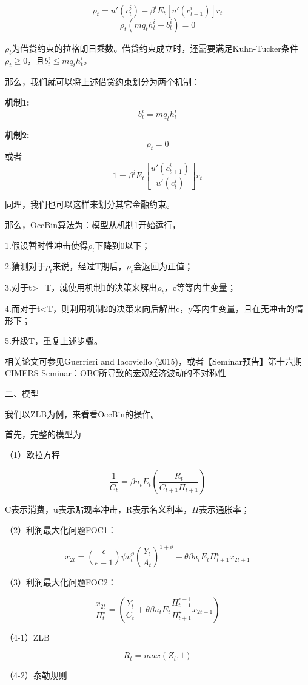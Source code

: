 \documentclass[cn,10pt,math=newtx,citestyle=gb7714-2015,bibstyle=gb7714-2015]{elegantbook}
\begin{document}
$$\rho_t=u'(c_t^i)-\beta^iE_t\left[u'(c_{t+1}^i)\right]r_t$$
$$\rho_t\left(mq_th_t^i-b_t^i\right)=0$$

$\rho_t$为借贷约束的拉格朗日乘数。借贷约束成立时，还需要满足Kuhn-Tucker条件$\rho_t\ge0$，且$b_t^i\le mq_th_t^i$。

那么，我们就可以将上述借贷约束划分为两个机制：

\textbf{机制1:}
$$b_t^i=mq_th_t^i$$

\textbf{机制2:}
$$\rho_t=0$$
或者
$$ 1=\beta^iE_t\left[\frac{u'(c_{t+1}^i)}{u'(c_{t}^i)}\right]r_t$$

同理，我们也可以这样来划分其它金融约束。



那么，OccBin算法为：模型从机制1开始运行，

1.假设暂时性冲击使得$\rho_t$下降到0以下；

2.猜测对于$\rho_t$来说，经过T期后，$\rho_t$会返回为正值；

3.对于t>=T，就使用机制1的决策来解出$\rho_t$，c等等内生变量；

4.而对于t<T，则利用机制2的决策来向后解出c，y等内生变量，且在无冲击的情形下；

5.升级T，重复上述步骤。



相关论文可参见Guerrieri and Iacoviello (2015)，或者【Seminar预告】第十六期CIMERS Seminar：OBC所导致的宏观经济波动的不对称性

二、模型

我们以ZLB为例，来看看OccBin的操作。

首先，完整的模型为

（1）欧拉方程

$$\frac{1}{C_t}=\beta u_tE_t\left(\frac{R_t}{C_{t+1}\Pi_{t+1}}\right)$$

C表示消费，u表示贴现率冲击，R表示名义利率，$\Pi$表示通胀率；

（2）利润最大化问题FOC1：

$$x_{2t}=\left(\frac{\epsilon}{\epsilon-1}\right)\psi v_t^{\vartheta}\left(\frac{Y_t}{A_t}\right)^{1+\vartheta}+\theta\beta u_tE_t\Pi_{t+1}^{\epsilon}x_{2t+1}$$


（3）利润最大化问题FOC2：

$$\frac{x_{2t}}{\Pi_t^{\star}}=\left(\frac{Y_t}{C_t}+\theta\beta u_tE_t\frac{\Pi_{t+1}^{\epsilon-1}}{\Pi_{t+1}^{\star}}x_{2t+1}\right)$$


（4-1）ZLB

$$R_t=max(Z_t,1)$$

（4-2）泰勒规则
\end{document}
